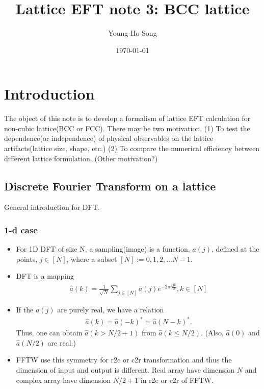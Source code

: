 \documentclass[10pt]{book}
\title{Lattice EFT note 3: BCC lattice}
\author{Young-Ho Song}
\date{\today}
\newcommand{\bea}{\begin{eqnarray}}
\newcommand{\eea}{\end{eqnarray}}
\begin{document}
\maketitle
\tableofcontents
\newpage

\chapter{Introduction}

The object of this note is to develop a formalism of lattice EFT calculation
for non-cubic lattice(BCC or FCC). 
There may be two motivation. (1) To test the dependence(or independence) 
of physical observables on the lattice artifacts(lattice size, shape, etc.)  
(2) To compare the numerical efficiency between different lattice formulation. 
(Other motivation?)



\section{Discrete Fourier Transform on a lattice}
General introduction for DFT.

\subsection{1-d case}
\begin{itemize}
	\item For 1D DFT of size N, a sampling(image) is a function, $a(j)$, defined
	at the points, $j\in[N]$, where a subset $[N]:={0,1,2,\dots N-1} $.
	\item DFT is a mapping
	\bea 
	\hat{a}(k)=\frac{1}{\sqrt{N}}\sum_{j\in[N]} a(j) e^{-2\pi i \frac{jk}{N} }, k\in [N]
	\eea 
	\item If the $a(j)$ are purely real, we have a relation
	\bea 
	\hat{a}(k)=\hat{a}(-k)^*=\hat{a}(N-k)^* . 
	\eea 
	Thus, one can obtain $\hat{a}(k> N/2+1)$ from $\hat{a}(k\leq N/2)$. 
	(Also, $\hat{a}(0)$ and $\hat{a}(N/2)$ are real.)
	\item FFTW use this symmetry for r2c or c2r transformation and thus
	the dimension of input and output is different. Real array
	have dimension $N$ and complex array have dimension $N/2+1$ in r2c or c2r of FFTW.
\end{itemize}
\end{document}
